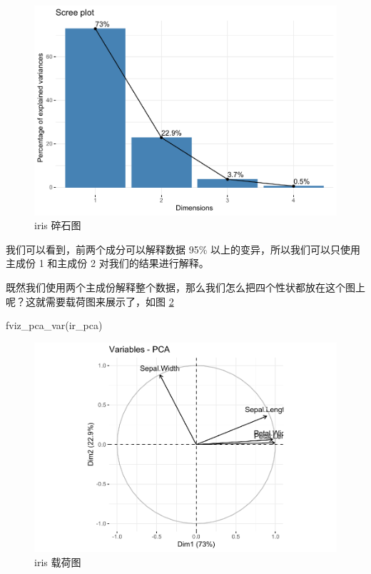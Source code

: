 \documentclass[
]{krantz}
\makeatletter
\newenvironment{Shaded}{\begin{snugshade}}{\end{snugshade}}
\newcommand{\FunctionTok}[1]{\textcolor[rgb]{0.00,0.00,0.00}{#1}}
\newcommand{\NormalTok}[1]{#1}
\newenvironment{kframe}{%
\medskip{}
\setlength{\fboxsep}{.8em}
 \def\at@end@of@kframe{}%
 \ifinner\ifhmode%
  \def\at@end@of@kframe{\end{minipage}}%
  \begin{minipage}{\columnwidth}%
 \fi\fi%
 \def\FrameCommand##1{\hskip\@totalleftmargin \hskip-\fboxsep
 \colorbox{shadecolor}{##1}\hskip-\fboxsep
     \hskip-\linewidth \hskip-\@totalleftmargin \hskip\columnwidth}%
 \MakeFramed {\advance\hsize-\width
   \@totalleftmargin\z@ \linewidth\hsize
   \@setminipage}}%
 {\par\unskip\endMakeFramed%
 \at@end@of@kframe}
\renewenvironment{Shaded}{\begin{kframe}}{\end{kframe}}
\makeatother
\begin{document}
\begin{figure}
\centering
\includegraphics{bookdown_files/figure-latex/scree-1.pdf}
\caption{\label{fig:scree}iris 碎石图}
\end{figure}

我们可以看到，前两个成分可以解释数据 95\% 以上的变异，所以我们可以只使用主成份 1 和主成份 2 对我们的结果进行解释。

既然我们使用两个主成份解释整个数据，那么我们怎么把四个性状都放在这个图上呢？这就需要载荷图来展示了，如图 \ref{fig:loadingpca}

\begin{Shaded}
\begin{Highlighting}[]
\FunctionTok{fviz\_pca\_var}\NormalTok{(ir\_pca)}
\end{Highlighting}
\end{Shaded}

\begin{figure}
\centering
\includegraphics{bookdown_files/figure-latex/loadingpca-1.pdf}
\caption{\label{fig:loadingpca}iris 载荷图}
\end{figure}
\end{document}
